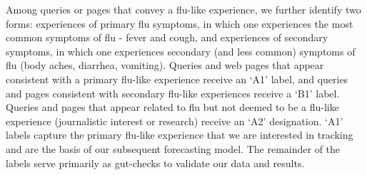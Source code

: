 \documentclass[12pt]{article}
\begin{document}
Among queries or pages that convey a flu-like experience, we further identify two forms: experiences of primary flu symptoms, in which one experiences the most common symptoms of flu  - fever and cough, and experiences of secondary symptoms, in which one experiences secondary (and less common) symptoms of flu (body aches, diarrhea, vomiting). Queries and web pages that appear consistent with a primary flu-like experience receive an `A1' label, and queries and pages consistent with secondary flu-like experiences receive a `B1' label. Queries and pages that appear related to flu but not deemed to be a flu-like experience (journalistic interest or research) receive an `A2' designation. `A1' labels capture the primary flu-like experience that we are interested in tracking and are the basis of our subsequent forecasting model. The remainder of the labels serve primarily as gut-checks to validate our data and results. 
\end{document}
